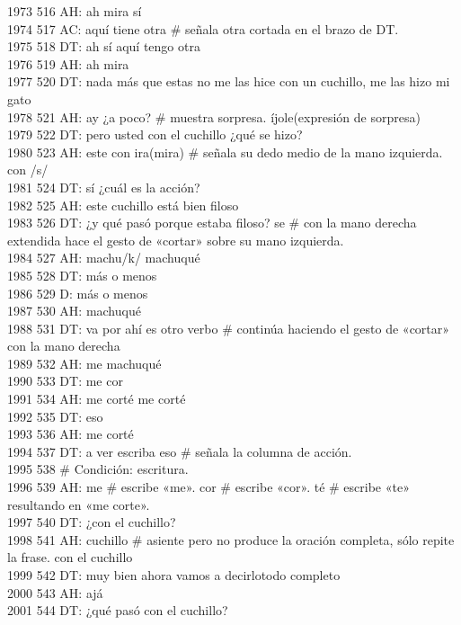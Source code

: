 1973 516 AH: ah mira sí\\
1974 517 AC: aquí tiene otra # señala otra cortada en el brazo de DT.\\
1975 518 DT: ah sí aquí tengo otra\\
1976 519 AH: ah mira\\
1977 520 DT: nada más que estas no me las hice con un cuchillo, me las hizo mi gato\\
1978 521 AH: ay ¿a poco? # muestra sorpresa. íjole(expresión de sorpresa)\\
1979 522 DT: pero usted con el cuchillo ¿qué se hizo?\\
1980 523 AH: este con ira(mira) # señala su dedo medio de la mano izquierda. con /s/\\
1981 524 DT: sí ¿cuál es la acción?\\
1982 525 AH: este cuchillo está bien filoso\\
1983 526 DT: ¿y qué pasó porque estaba filoso? se # con la mano derecha extendida hace el gesto de «cortar» sobre su mano izquierda.\\
1984 527 AH: machu/k/ machuqué\\
1985 528 DT: más o menos\\
1986 529 D: más o menos\\
1987 530 AH: machuqué\\
1988 531 DT: va por ahí es otro verbo # continúa haciendo el gesto de «cortar» con la mano derecha\\
1989 532 AH: me machuqué\\
1990 533 DT: me cor\\
1991 534 AH: me corté me corté\\
1992 535 DT: eso\\
1993 536 AH: me corté\\
1994 537 DT: a ver escriba eso # señala la columna de acción.\\
1995 538 # Condición: escritura.\\
1996 539 AH: me # escribe «me». cor # escribe «cor». té # escribe «te» resultando en «me corte».\\
1997 540 DT: ¿con el cuchillo?\\
1998 541 AH: cuchillo # asiente pero no produce la oración completa, sólo repite la frase. con el cuchillo\\
1999 542 DT: muy bien ahora vamos a decirlotodo completo\\
2000 543 AH: ajá\\
2001 544 DT: ¿qué pasó con el cuchillo?\\
